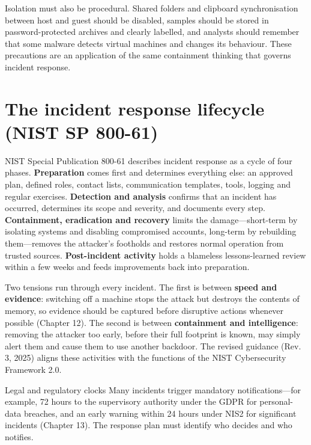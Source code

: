 \documentclass[11pt,openany]{book}
\begin{document}
Isolation must also be procedural. Shared folders and clipboard synchronisation between host and guest should be disabled, samples should be stored in password-protected archives and clearly labelled, and analysts should remember that some malware detects virtual machines and changes its behaviour. These precautions are an application of the same containment thinking that governs incident response.

\section{The incident response lifecycle (NIST SP 800-61)}\label{sec:11.6}
NIST Special Publication 800-61 describes incident response as a cycle of four phases. \textbf{Preparation} comes first and determines everything else: an approved plan, defined roles, contact lists, communication templates, tools, logging and regular exercises. \textbf{Detection and analysis} confirms that an incident has occurred, determines its scope and severity, and documents every step. \textbf{Containment, eradication and recovery} limits the damage—short-term by isolating systems and disabling compromised accounts, long-term by rebuilding them—removes the attacker's footholds and restores normal operation from trusted sources. \textbf{Post-incident activity} holds a blameless lessons-learned review within a few weeks and feeds improvements back into preparation.

Two tensions run through every incident. The first is between \textbf{speed and evidence}: switching off a machine stops the attack but destroys the contents of memory, so evidence should be captured before disruptive actions whenever possible (Chapter 12). The second is between \textbf{containment and intelligence}: removing the attacker too early, before their full footprint is known, may simply alert them and cause them to use another backdoor. The revised guidance (Rev. 3, 2025) aligns these activities with the functions of the NIST Cybersecurity Framework 2.0.

\begin{notebox}{Legal and regulatory clocks}
Many incidents trigger mandatory notifications—for example, 72 hours to the supervisory authority under the GDPR for personal-data breaches, and an early warning within 24 hours under NIS2 for significant incidents (Chapter 13). The response plan must identify who decides and who notifies.
\end{notebox}
\end{document}
